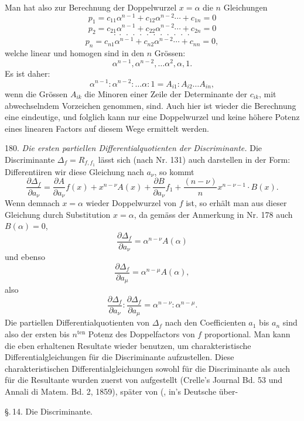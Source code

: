 Man hat also zur Berechnung der Doppelwurzel $x=\alpha$ die
$n$ Gleichungen
\[
p_1 = c_{11}\alpha^{n-1} + c_{12}\alpha^{n-2} \cdots + c_{1n} = 0
\]
\[
p_2 = c_{21}\alpha^{n-1} + c_{22}\alpha^{n-2} \cdots + c_{2n} = 0
\]
\[
\cdot\ \cdot\ \cdot\ \cdot\ \cdot\ \cdot\ \cdot\ \cdot\ \cdot\ \cdot\ \cdot\ \cdot
\]
\[
p_n = c_{n1}\alpha^{n-1} + c_{n2}\alpha^{n-2} \cdots + c_{nn} = 0,
\]
welche linear und homogen sind in den $n$ Grössen:
\[
\alpha^{n-1}, \alpha^{n-2}, \ldots \alpha^2, \alpha, 1.
\]
Es ist daher:
\[
\alpha^{n-1} : \alpha^{n-2} : \ldots \alpha : 1 = A_{i1} : A_{i2} \ldots A_{in},
\]
wenn die Grössen $A_{ik}$ die Minoren einer Zeile der Determinante der
$c_{ik}$, mit abwechselndem Vorzeichen genommen, sind. Auch hier ist
wieder die Berechnung eine eindeutige, und folglich kann nur eine
Doppelwurzel und keine höhere Potenz eines linearen Factors auf
diesem Wege ermittelt werden.

180. \textit{Die ersten partiellen Differentialquotienten der Discriminante.}
Die Discriminante $\Delta_f = R_{f,f_1}$ lässt sich (nach Nr. 131) auch darstellen
in der Form:
Differentiiren wir diese Gleichung nach $a_\nu$, so kommt
\[
\frac{\partial \Delta_f}{\partial a_\nu} = \frac{\partial A}{\partial a_\nu} f(x) + x^{n-\nu} A(x) + \frac{\partial B}{\partial a_\nu} f_1 + \frac{(n-\nu)}{n} x^{n-\nu-1} \cdot B(x).
\]
Wenn demnach $x=\alpha$ wieder Doppelwurzel von $f$ ist, so erhält man
aus dieser Gleichung durch Substitution $x=\alpha$, da gemäss der Anmerkung in Nr. 178 auch $B(\alpha)=0$,
\[
\frac{\partial \Delta_f}{\partial a_\nu} = \alpha^{n-\nu} A(\alpha)
\]
und ebenso
\[
\frac{\partial \Delta_f}{\partial a_\mu} = \alpha^{n-\mu} A(\alpha),
\]
also
\[
\frac{\partial \Delta_f}{\partial a_\nu} : \frac{\partial \Delta_f}{\partial a_\mu} = \alpha^{n-\nu} : \alpha^{n-\mu}.
\]
Die partiellen Differentialquotienten von $\Delta_f$ nach den Coefficienten
$a_1$ bis $a_n$ sind also der ersten bis $n^{\text{ten}}$ Potenz des Doppelfactors von $f$
proportional. Man kann die eben erhaltenen Resultate wieder benutzen, um charakteristische Differentialgleichungen für die Discriminante
aufzustellen. Diese charakteristischen Differentialgleichungen sowohl
für die Discriminante als auch für die Resultante wurden zuerst von
 aufgestellt (Crelle's Journal Bd. 53 und Annali di Matem.
Bd. 2, 1859), später von  (, in's Deutsche über-


\S.\,14. Die Discriminante.

